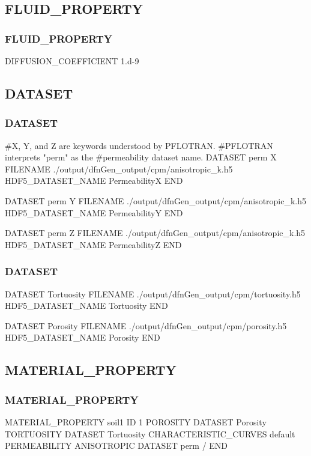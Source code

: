 \documentclass{beamer}
\newcommand\bluecomment[1]{{{\color{blue} #1}}}
\newcommand\magentacomment[1]{{{\color{magenta} #1}}}
\begin{document}
\subsection{FLUID\_PROPERTY}
\begin{frame}\frametitle{FLUID\_PROPERTY}
	\begin{semiverbatim}
		DIFFUSION_COEFFICIENT 1.d-9
	\end{semiverbatim}
\end{frame}

\subsection{DATASET}
\begin{frame}\frametitle{DATASET}
	\begin{semiverbatim}
\bluecomment{#X, Y, and Z are keywords understood by PFLOTRAN. 
#PFLOTRAN interprets "perm" as the 
#permeability dataset name.}
DATASET perm\magentacomment{X}
  FILENAME ./output/dfnGen_output/cpm/anisotropic_k.h5
  HDF5_DATASET_NAME PermeabilityX
END

DATASET perm\magentacomment{Y}
  FILENAME ./output/dfnGen_output/cpm/anisotropic_k.h5
  HDF5_DATASET_NAME PermeabilityY
END

DATASET perm\magentacomment{Z}
  FILENAME ./output/dfnGen_output/cpm/anisotropic_k.h5
  HDF5_DATASET_NAME PermeabilityZ
END
	\end{semiverbatim}
	
\end{frame}

\begin{frame}\frametitle{DATASET}
	\begin{semiverbatim}
DATASET Tortuosity
  FILENAME ./output/dfnGen_output/cpm/tortuosity.h5
  HDF5_DATASET_NAME Tortuosity
END
		
DATASET Porosity
  FILENAME ./output/dfnGen_output/cpm/porosity.h5
  HDF5_DATASET_NAME Porosity
END
	\end{semiverbatim}
	
\end{frame}

\subsection{MATERIAL\_PROPERTY}
\begin{frame}\frametitle{MATERIAL\_PROPERTY}
	\begin{semiverbatim}
		MATERIAL_PROPERTY soil1
		  ID 1
		  POROSITY DATASET Porosity
		  TORTUOSITY DATASET Tortuosity
		  CHARACTERISTIC_CURVES default
		  PERMEABILITY
		    ANISOTROPIC
		    \magentacomment{DATASET perm}
		  /
		END
	\end{semiverbatim}
\end{frame}
\end{document}
